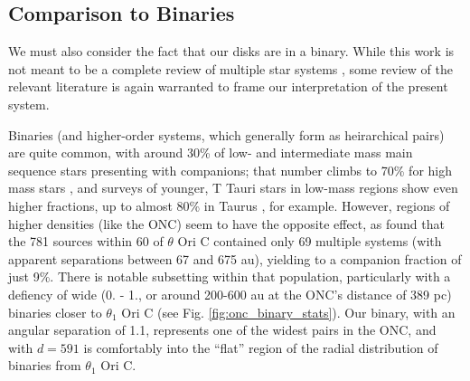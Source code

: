 \subsection{Comparison to Binaries}





We must also consider the fact that our disks are in a binary. While this work is not meant to be a complete review of multiple star systems \citep[for a more comprehensive review, see][]{DucheneKraus2013}, some review of the relevant literature is again warranted to frame our interpretation of the present system.

Binaries (and higher-order systems, which generally form as heirarchical pairs) are quite common, with around 30\% of low- and intermediate mass main sequence stars presenting with companions; that number climbs to 70\% for high mass stars \citep{Sana2012}, and surveys of younger, T Tauri stars in low-mass regions show even higher fractions, up to almost 80\% in Taurus \citep{Kraus2011}, for example. However, regions of higher densities (like the ONC) seem to have the opposite effect, as \citet{Reipurth2007} found that the 781 sources within 60\arcsec{} of $\theta$ Ori C contained only 69 multiple systems (with apparent separations between 67 and 675 au), yielding to a companion fraction of just 9\%. There is notable subsetting within that population, particularly with a defiency of wide (0. - 1., or around 200-600 au at the ONC's distance of 389 pc) binaries closer to $\theta_1$ Ori C (see Fig. \ref{fig:onc_binary_stats}). Our binary, with an angular separation of 1.\arcsec{}1, represents one of the widest pairs in the ONC, and with $d = 591$\arcsec{} is comfortably into the ``flat'' region of the radial distribution of binaries from $\theta_1$ Ori C.


